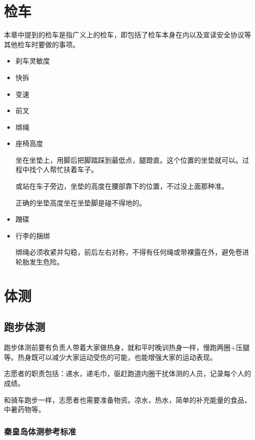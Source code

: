 \documentclass{ctexbook}
\begin{document}
\section{检车}
\label{sec:检车}
本章中提到的检车是指广义上的检车，即包括了检车本身在内以及宣读安全协议等其他检车时要做的事项。
\begin{itemize}

\item 刹车灵敏度

\item 快拆

\item 变速

\item 前叉

\item 绑绳

\item 座椅高度

坐在坐垫上，用脚后把脚踏踩到最低点，腿蹬直。这个位置的坐垫就可以。过程中找个人帮忙扶着车子。

或站在车子旁边，坐垫的高度在腰部靠下的位置，不过没上面那种准。

正确的坐垫高度坐在坐垫脚是碰不得地的。

\item 蹭碟

\item 行李的捆绑

绑绳必须收紧并勾稳，前后左右对称，不得有任何绳或带裸露在外，避免卷进轮胎发生危险。
\end{itemize}
\section{体测}

\subsection{跑步体测}
跑步体测前要有负责人带着大家做热身，就和平时晚训热身一样，慢跑两圈+压腿等。热身既可以减少大家运动受伤的可能，也能增强大家的运动表现。

志愿者的职责包括：递水，递毛巾，驱赶跑道内圈干扰体测的人员，记录每个人的成绩。

和骑车跑步一样，志愿者也需要准备物资。凉水，热水，简单的补充能量的食品，中暑药物等。

\subsubsection{秦皇岛体测参考标准}
\end{document}
